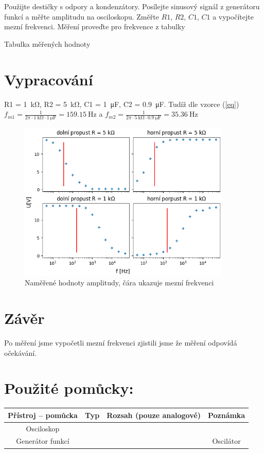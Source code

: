 \documentclass[12pt,a4paper]{article}
\begin{document}
Použijte destičky s odpory a kondenzátory. Posílejte sinusový signál z generátoru funkcí a měřte amplitudu na osciloskopu. Změřte $R1$, $R2$, $C1$, $C1$ a vypočítejte mezní frekvenci. Měření proveďte pro frekvence z tabulky
\begin{table}[h!]
	\begin{center}\def\arraystretch{1}
		\caption{Tabulka měřených hodnoty}
		\label{table1}
	\end{center}
\end{table}
\section*{Vypracování}
	R1 = \SI{1}{\kilo\ohm},
	R2 = \SI{5}{\kilo\ohm},
	C1 = \SI{1}{\micro\farad},
	C2 = \SI{0.9}{\micro\farad}.
Tudíž dle vzorce (\ref{eq}) $f_{m1} = \frac{1}{2\pi\cdot \SI{1}{\kilo\ohm}\cdot \SI{1}{\micro\farad}} = \SI{159.15}{\hertz}$ a $f_{m2} = \frac{1}{2\pi\cdot \SI{5}{\kilo\ohm}\cdot \SI{0.9}{\micro\farad}} = \SI{35.36}{\hertz}$
\begin{figure}[H]
	\centering
	\includegraphics[width=0.9\textwidth]{fancy3.png}
	\caption{Naměřené hodnoty amplitudy, čára ukazuje mezní frekvenci}
\end{figure}
\section*{Závěr}
Po měření jsme vypočetli mezní frekvenci zjistili jsme že měření odpovídá očekávání. \enlargethispage{20mm}
\section*{Použité pomůcky:}
\begin{tabularx}{\linewidth}{c|c|c|c}
	Přístroj – pomůcka & Typ & Rozsah (pouze analogové)
	& Poznámka \\
	\hline
	Osciloskop & & &\\
	\hline
	Generátor funkcí & & &Oscilátor\\
\end{tabularx}
\end{document}
